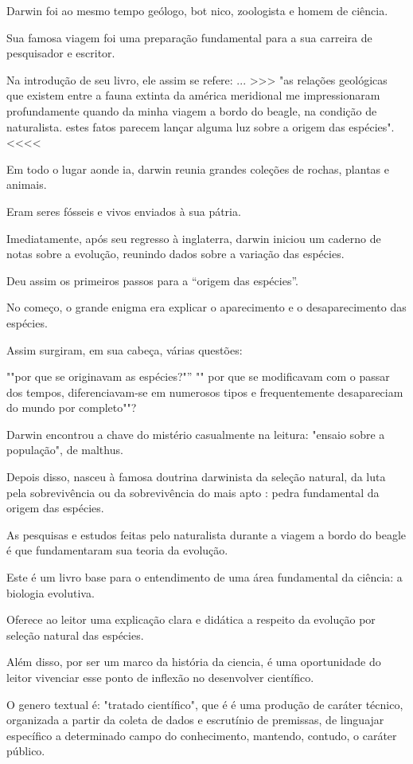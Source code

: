 \documentclass[12pt]{extarticle}
\begin{document}
Darwin foi ao mesmo tempo geólogo, bot nico, zoologista e homem de ciência. 

Sua famosa viagem foi uma preparação fundamental para a sua carreira de pesquisador e escritor. 

Na introdução de seu livro, ele assim se refere: 
... >>>   "as relações geológicas que existem entre a fauna extinta da américa meridional me impressionaram profundamente quando da minha viagem a bordo do beagle, na condição de naturalista. 
estes fatos parecem lançar alguma luz sobre a origem das espécies". <<<<

Em todo o lugar aonde ia, darwin reunia grandes coleções de rochas, plantas e animais.

Eram seres fósseis e vivos enviados à sua pátria. 

Imediatamente, após seu regresso à inglaterra, darwin iniciou um caderno de notas sobre a evolução, reunindo dados sobre a variação das espécies. 

Deu assim os primeiros passos para a “origem das espécies”. 

No começo, o grande enigma era explicar o aparecimento e o desaparecimento das espécies.

Assim surgiram, em sua cabeça, várias questões:  

""por que se originavam as espécies?"”
"" por que se modificavam com o passar dos tempos, diferenciavam-se em numerosos tipos e frequentemente desapareciam do mundo por completo""?

Darwin encontrou a chave do mistério  casualmente na leitura: 
"ensaio sobre a população", de malthus.

Depois disso, nasceu à famosa doutrina darwinista da seleção natural, da luta pela sobrevivência ou da sobrevivência do mais apto : pedra fundamental da origem das espécies.

As pesquisas e estudos feitas pelo naturalista durante a viagem a bordo do beagle é que fundamentaram sua teoria da evolução.

Este é um livro base para o entendimento de uma área fundamental da ciência: a biologia evolutiva.

Oferece ao leitor uma explicação clara e didática a respeito da evolução por seleção natural das espécies.

Além disso,  por ser um marco da história da ciencia, 
é uma oportunidade do leitor vivenciar esse ponto de inflexão no desenvolver científico.


O genero textual  é: "tratado científico",   que é  é uma produção de caráter técnico,  organizada a partir da coleta de dados e escrutínio de premissas, de linguajar específico a determinado campo do conhecimento,  mantendo, contudo, o caráter público.
\end{document}
